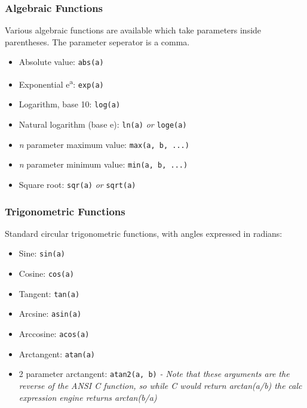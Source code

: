 \subsubsection{Algebraic Functions}

Various algebraic functions are available which take parameters inside parentheses.
The parameter seperator is a comma.

\begin{itemize}
\item Absolute value: \verb|abs(a)|

\item Exponential e\textsuperscript{a}: \verb|exp(a)|

\item Logarithm, base 10: \verb|log(a)|

\item Natural logarithm (base e): \verb|ln(a)| \emph{or} \verb|loge(a)|

\item \emph{n} parameter maximum value: \verb|max(a, b, ...)|

\item \emph{n} parameter minimum value: \verb|min(a, b, ...)|

\item Square root: \verb|sqr(a)| \emph{or} \verb|sqrt(a)|

\end{itemize}

\subsubsection{Trigonometric Functions}

Standard circular trigonometric functions, with angles expressed in radians:

\begin{itemize}
\item Sine: \verb|sin(a)|

\item Cosine: \verb|cos(a)|

\item Tangent: \verb|tan(a)|

\item Arcsine: \verb|asin(a)|

\item Arccosine: \verb|acos(a)|

\item Arctangent: \verb|atan(a)|

\item 2 parameter arctangent:
\verb|atan2(a, b)| \emph{- Note that these arguments are the reverse of the ANSI C function, so while C would return arctan(a/b) the calc expression engine returns arctan(b/a)}

\end{itemize}

